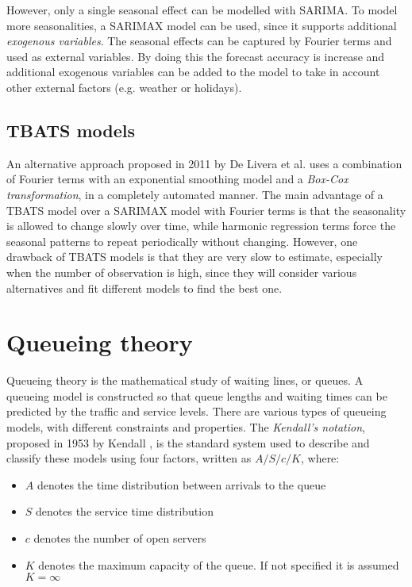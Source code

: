 However, only a single seasonal effect can be modelled with SARIMA. To model more seasonalities, a SARIMAX model can be used, since it supports additional \emph{exogenous variables}. The seasonal effects can be captured by Fourier terms and used as external variables. By doing this the forecast accuracy is increase and additional exogenous variables can be added to the model to take in account other external factors (e.g. weather or holidays).

\subsection{TBATS models}
\label{subsec:tbats_models}

An alternative approach proposed in 2011 by De Livera et al. \cite{de_livera} uses a combination of Fourier terms with an exponential smoothing model and a \emph{Box-Cox transformation}, in a completely automated manner. The main advantage of a TBATS model over a SARIMAX model with Fourier terms is that the seasonality is allowed to change slowly over time, while harmonic regression terms force the seasonal patterns to repeat periodically without changing. However, one drawback of TBATS models is that they are very slow to estimate, especially when the number of observation is high, since they will consider various alternatives and fit different models to find the best one.

\section{Queueing theory}
\label{sec:queueing_theory}

Queueing theory is the mathematical study of waiting lines, or queues. A queueing model is constructed so that queue lengths and waiting times can be predicted by the traffic and service levels. There are various types of queueing models, with different constraints and properties. The \emph{Kendall's notation}, proposed in 1953 by Kendall \cite{kendall}, is the standard system used to describe and classify these models using four factors, written as \( A/S/c/K \), where:
\begin{itemize}
  \item \( A \) denotes the time distribution between arrivals to the queue
  \item \( S \) denotes the service time distribution
  \item \( c \) denotes the number of open servers
  \item \( K \) denotes the maximum capacity of the queue. If not specified it is assumed \( K = \infty \)
\end{itemize}

